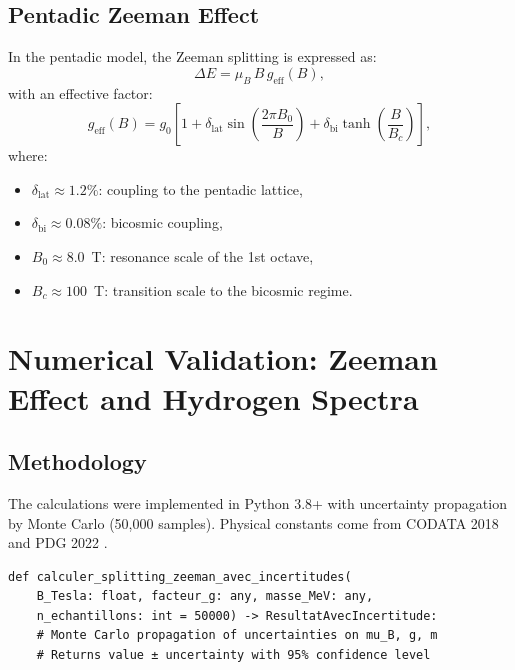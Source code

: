 \documentclass[11pt,a4paper]{article}
\theoremstyle{plain}
\theoremstyle{definition}
\theoremstyle{remark}
\begin{document}
\subsection{Pentadic Zeeman Effect}

In the pentadic model, the Zeeman splitting is expressed as:
\begin{equation}
  \Delta E = \mu_B \, B \, g_{\mathrm{eff}}(B),
\end{equation}
with an effective factor:
\begin{equation}
  g_{\mathrm{eff}}(B) = g_0 \left[ 1 + \delta_{\mathrm{lat}} \sin\left(\frac{2\pi B_0}{B}\right) + \delta_{\mathrm{bi}} \tanh\left(\frac{B}{B_c}\right) \right],
  \label{eq:geff}
\end{equation}
where:
\begin{itemize}
  \item $\delta_{\mathrm{lat}} \approx 1.2\%$: coupling to the pentadic lattice,
  \item $\delta_{\mathrm{bi}} \approx 0.08\%$: bicosmic coupling,
  \item $B_0 \approx 8.0$~T: resonance scale of the 1st octave,
  \item $B_c \approx 100$~T: transition scale to the bicosmic regime.
\end{itemize}

\section{Numerical Validation: Zeeman Effect and Hydrogen Spectra}
\label{sec:validation}

\subsection{Methodology}

The calculations were implemented in Python 3.8+ with uncertainty propagation by Monte Carlo (50,000 samples). Physical constants come from CODATA 2018 \cite{codata2018} and PDG 2022 \cite{pdg2022}.

\begin{lstlisting}[caption={Excerpt from MODULE\_3: Zeeman splitting calculation with uncertainties},label={lst:zeeman}]
def calculer_splitting_zeeman_avec_incertitudes(
    B_Tesla: float, facteur_g: any, masse_MeV: any,
    n_echantillons: int = 50000) -> ResultatAvecIncertitude:
    # Monte Carlo propagation of uncertainties on mu_B, g, m
    # Returns value ± uncertainty with 95% confidence level
\end{lstlisting}
\end{document}
